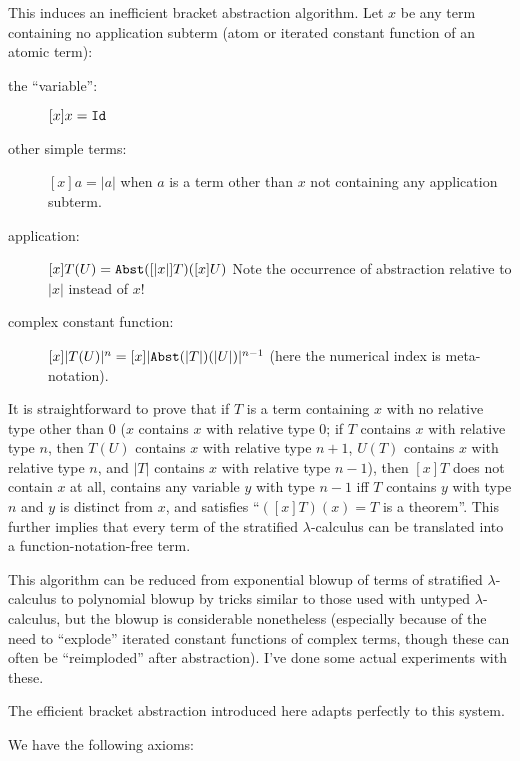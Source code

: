 \documentclass{article}
\begin{document}
This induces an inefficient bracket abstraction algorithm.  Let $x$ be
any term containing no application subterm (atom or iterated constant
function of an atomic term):

\begin{description}

\item[the ``variable'':]  $[x]x = {\tt Id}$

\item[other simple terms:] $[x]a = |a|$ when $a$ is a term other than
$x$ not containing any application subterm.

\item[application:] $[x]T(U) = {\tt Abst}([|x|]T)([x]U)$ Note the
occurrence of abstraction relative to $|x|$ instead of $x$!

\item[complex constant function:] $[x]|T(U)|^n = [x]|{\tt
Abst}(|T|)(|U|)|^{n-1}$ (here the numerical index is meta-notation).

\end{description}

It is straightforward to prove that if $T$ is a term containing $x$
with no relative type other than 0 ($x$ contains $x$ with relative
type 0; if $T$ contains $x$ with relative type $n$, then $T(U)$
contains $x$ with relative type $n+1$, $U(T)$ contains $x$ with
relative type $n$, and $|T|$ contains $x$ with relative type $n-1$),
then $[x]T$ does not contain $x$ at all, contains any variable $y$
with type $n-1$ iff $T$ contains $y$ with type $n$ and $y$ is distinct
from $x$, and satisfies ``$([x]T)(x)=T$ is a theorem''.  This further
implies that every term of the stratified $\lambda$-calculus can be
translated into a function-notation-free term.

This algorithm can be reduced from exponential blowup of terms of
stratified $\lambda$-calculus to polynomial blowup by tricks similar
to those used with untyped $\lambda$-calculus, but the blowup is
considerable nonetheless (especially because of the need to
``explode'' iterated constant functions of complex terms, though these
can often be ``reimploded'' after abstraction).  I've done some actual
experiments with these.

The efficient bracket abstraction introduced here adapts perfectly to this
system.

We have the following axioms:
\end{document}
